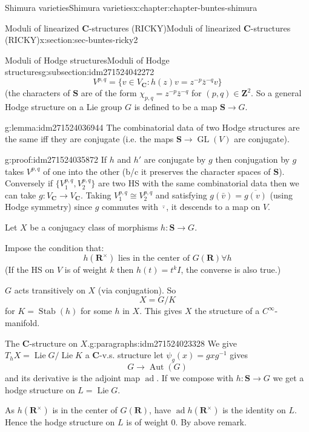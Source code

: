 \documentclass[oneside,10pt,]{book}
\numberwithin{equation}{section}
\DeclareMathOperator{\Lie}{Lie}
\newcommand{\inv}{^{-1}}
\newcommand{\ZZ}{\mathbf{Z}}
\newcommand{\RR}{\mathbf{R}}
\newcommand{\CC}{\mathbf{C}}
\DeclareMathOperator{\Stab}{Stab}
\DeclareMathOperator{\ad}{ad}
\DeclareMathOperator{\Aut}{Aut}
\DeclareMathOperator{\GL}{GL}
\begin{document}
\begin{chapterptx}{Shimura varieties}{}{Shimura varieties}{}{}{x:chapter:chapter-buntes-shimura}
\begin{sectionptx}{Moduli of linearized \(\CC\)-structures (RICKY)}{}{Moduli of linearized \(\CC\)-structures (RICKY)}{}{}{x:section:sec-buntes-ricky2}
\begin{subsectionptx}{Moduli of Hodge structures}{}{Moduli of Hodge structures}{}{}{g:subsection:idm271524042272}
\begin{equation*}
V^{p,q} = \{ v \in V_\CC : h(z) v= z^{-p} \bar z ^{-q} v\}
\end{equation*}
(the characters of \(\mathbf S\) are of the form \(\chi_{p,q} = z^{-p} \bar z ^{-q}\) for \((p,q)\in \ZZ^2\). So a general Hodge structure on a Lie group  \(G\) is defined to be a map \(\mathbf S \to G\).%
\begin{lemma}{}{}{g:lemma:idm271524036944}%
The combinatorial data of two Hodge structures are the same iff they are conjugate (i.e. the maps \(\mathbf S \to \GL(V)\) are conjugate).%
\end{lemma}
\begin{proofptx}{}{g:proof:idm271524035872}
If \(h\) and \(h'\) are conjugate by \(g\) then conjugation by \(g\) takes \(V^{p,q}\) of one into the other (b\slash{}c it preserves the character spaces of \(\mathbf S\)). Conversely if \(\{V_1^{p,q}, V_2^{p,q}\}\) are two HS with the same combinatorial data then we can take \(g \colon V_{\CC} \to V_{\CC}\). Taking \(V_1^{p,q} \cong V_2^{p,q}\) and satisfying \(g(\bar v) = \overline{g(v)}\) (using Hodge symmetry) since \(g\) commutes with \(\bar \cdot\), it descends to a  map on \(V\).%
\end{proofptx}
Let  \(X\) be a conjugacy class of morphisms \(h\colon \mathbf S \to G\).%
\par
Impose the condition that:%
\begin{equation}
h(\RR^\times) \text{ lies in the center of }G(\RR) \forall h\label{g:men:idm271524028448}
\end{equation}
(If the HS on \(V\) is of weight \(k\) then \(h(t) = t^k I\), the converse is also true.)%
\par
\(G\) acts transitively on \(X\) (via conjugation). So%
\begin{equation*}
X=  G/K
\end{equation*}
for \(K = \Stab(h) \) for some \(h\) in \(X\). This gives \(X\) the structure of a \(C^\infty\)-manifold.%
\begin{paragraphs}{The \(\CC\)-structure on \(X\).}{g:paragraphs:idm271524023328}%
We give \(T_hX = \Lie G / \Lie K\) a \(\CC\)-v.s. structure let \(\psi_g (x)  = g x g \inv\) gives%
\begin{equation*}
G\to \Aut(G)
\end{equation*}
and its derivative is the adjoint map \(\ad\). If we compose with \(h \colon \mathbf S\to G\) we get a hodge structure on \(L=  \Lie G\).%
\par
As \(h(\RR^\times)\) is in the center of \(G(\RR)\), have \(\ad h(\RR^\times)\) is the identity on \(L\). Hence the hodge structure on \(L\) is of weight 0. By above remark.%

\end{paragraphs}
\end{subsectionptx}
\end{sectionptx}
\end{chapterptx}
\end{document}
